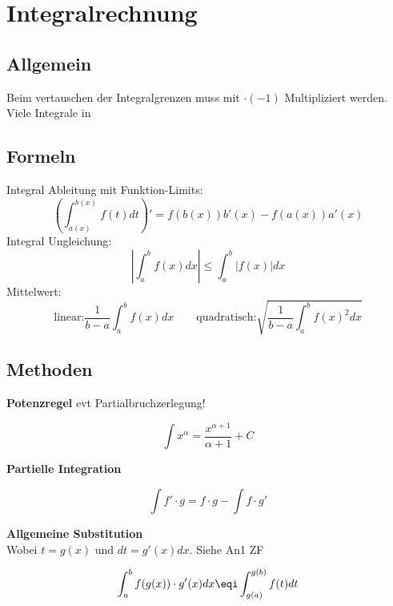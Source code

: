 \section{Integralrechnung}
\subsection{Allgemein}
Beim vertauschen der Integralgrenzen muss mit $\cdot (-1)$ Multipliziert werden. Viele Integrale in 

\subsection{Formeln}
\noindent Integral Ableitung mit Funktion-Limits: \[\left(\int_{a(x)}^{b(x)}f(t)dt\right)' = f(b(x))b'(x) - f(a(x))a'(x)\]
\noindent Integral Ungleichung:
\[\left|\int_{a}^{b}f(x)dx\right| \leq \int_{a}^{b}\left|f(x)\right|dx\]
\noindent Mittelwert:
\[\text{linear:} \frac{1}{b-a}\int_{a}^{b}f(x)dx \qquad \text{quadratisch:} \sqrt{\frac{1}{b-a}\int_{a}^{b}f(x)^2dx}\]


\subsection{Methoden}
\begin{center}
	\begin{minipage}{0.2\textwidth}
		\noindent\textbf{Potenzregel} evt Partialbruchzerlegung!
	\end{minipage}%
	\begin{minipage}{0.3\textwidth}
		\[ \int x^\alpha = \frac{x^{\alpha  + 1}}{\alpha + 1} + C \]
	\end{minipage}
\end{center}

\begin{center}
	\begin{minipage}{0.2\textwidth}
		\noindent\textbf{Partielle Integration}
	\end{minipage}%
	\begin{minipage}{0.3\textwidth}
		\[\int f' \cdot g = f \cdot g - \int f \cdot g'\]
	\end{minipage}
\end{center}

\begin{center}
	\begin{minipage}{0.2\textwidth}
		\noindent\textbf{Allgemeine Substitution}\\
		Wobei $t=g(x)$ und $dt = g'(x)dx$. Siehe An1 ZF
	\end{minipage}%
	\begin{minipage}{0.3\textwidth}
		\[\int_{a}^{b} f(g(x)) \cdot g'(x)dx \eqi \int_{g(a)}^{g(b)} f(t) dt\]
	\end{minipage}
\end{center}

